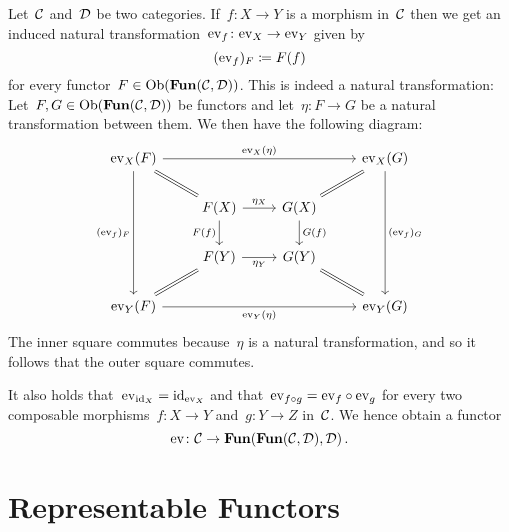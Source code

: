 \begin{remark}
  Let~$\mathcal{C}$ and~$\mathcal{D}$ be two categories.
  If~$f \colon X \to Y$ is a morphism in~$\mathcal{C}$ then we get an induced natural transformation~$\mathrm{ev}_f \colon \mathrm{ev}_X \to \mathrm{ev}_Y$ given by
  \[
              (\mathrm{ev}_f)_F
    \coloneqq  F(f)
  \]
  for every functor~$F \in \operatorname{Ob}(\mathbf{Fun}(\mathcal{C}, \mathcal{D}))$.
  This is indeed a natural transformation:
  Let~$F, G \in \operatorname{Ob}(\mathbf{Fun}(\mathcal{C}, \mathcal{D}))$ be functors and let~$\eta \colon F \to G$ be a natural transformation between them.
  We then have the following diagram:
  \[
    \begin{tikzcd}
        \ev_X(F)
        \arrow{rrr}[above]{\ev_X(\eta)}
        \arrow{ddd}[left]{(\ev_f)_F}
        \arrow[equal]{dr}
      & {}
      & {}
      & \ev_X(G)
        \arrow{ddd}[right]{(\ev_f)_G}
        \arrow[equal]{dl}
      \\
        {}
      & F(X)
        \arrow{r}[above]{\eta_X}
        \arrow{d}[left]{F(f)}
      & G(X)
        \arrow{d}[right]{G(f)}
      & {}
      \\
        {}
      & F(Y)
        \arrow{r}[below]{\eta_Y}
      & G(Y)
      & {}
      \\
        \ev_Y(F)
        \arrow{rrr}[below]{\ev_Y(\eta)}
        \arrow[equal]{ur}
      & {}
      & {}
      & \ev_Y(G)
        \arrow[equal]{ul}
    \end{tikzcd}
  \]
  The inner square commutes because~$\eta$ is a natural transformation, and so it follows that the outer square commutes.
  
  It also holds that~$\mathrm{ev}_{\mathrm{id}_X} = \mathrm{id}_{\mathrm{ev}_X}$ and that~$\mathrm{ev}_{f \circ g} = \mathrm{ev}_f \circ \mathrm{ev}_g$ for every two composable morphisms~$f \colon X \to Y$ and~$g \colon Y \to Z$ in~$\mathcal{C}$.
  We hence obtain a functor
  \[
            \mathrm{ev}
    \colon  \mathcal{C}
    \to     \mathbf{Fun}( \mathbf{Fun}(\mathcal{C}, \mathcal{D}), \mathcal{D} ) \,.
  \]

\end{remark}





\section{Representable Functors}


